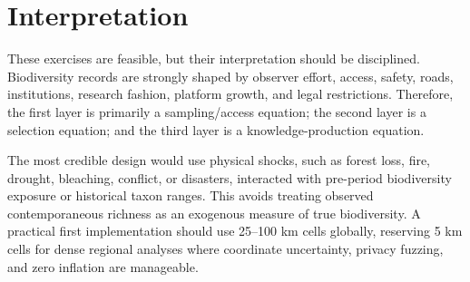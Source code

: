 \documentclass[10pt]{article}
\begin{document}
\section*{Interpretation}

These exercises are feasible, but their interpretation should be disciplined. Biodiversity records are strongly shaped by observer effort, access, safety, roads, institutions, research fashion, platform growth, and legal restrictions. Therefore, the first layer is primarily a sampling/access equation; the second layer is a selection equation; and the third layer is a knowledge-production equation.

The most credible design would use physical shocks, such as forest loss, fire, drought, bleaching, conflict, or disasters, interacted with pre-period biodiversity exposure or historical taxon ranges. This avoids treating observed contemporaneous richness as an exogenous measure of true biodiversity. A practical first implementation should use 25--100 km cells globally, reserving 5 km cells for dense regional analyses where coordinate uncertainty, privacy fuzzing, and zero inflation are manageable.
\end{document}
